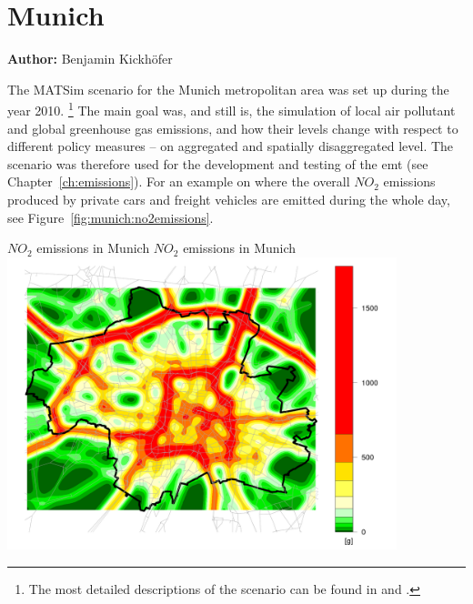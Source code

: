 \section{Munich}
\label{sec:munich}
\hfill \textbf{Author:} Benjamin Kickh\"ofer

The MATSim scenario for the Munich metropolitan area was set up during the year 2010.%
%
\footnote{
%
The most detailed descriptions of the scenario can be found in \citet{KickhoeferEtAl_VanoutriveVerhetsel_2013} and \citet{Kickhoefer_PhDThesis_2014}.
%
}
%
The main goal was, and still is, the simulation of local air pollutant and global greenhouse gas emissions, and how their levels change with respect to different policy measures -- on aggregated and spatially disaggregated level. The scenario was therefore used for the development and testing of the \gls{emt} (see Chapter~\ref{ch:emissions}). For an example on where the overall $\mathit{NO_2}$ emissions produced by private cars and freight vehicles are emitted during the whole day, see Figure~\ref{fig:munich:no2emissions}.

\createfigure%
{$\mathit{NO_2}$ emissions in Munich}%
{$\mathit{NO_2}$ emissions in Munich}%
{\label{fig:munich:no2emissions}}%
{\includegraphics[width=0.85\textwidth, angle=0]{./using/figures/baseCase_1500_NO2_g_108000_0.png}}%
{}

